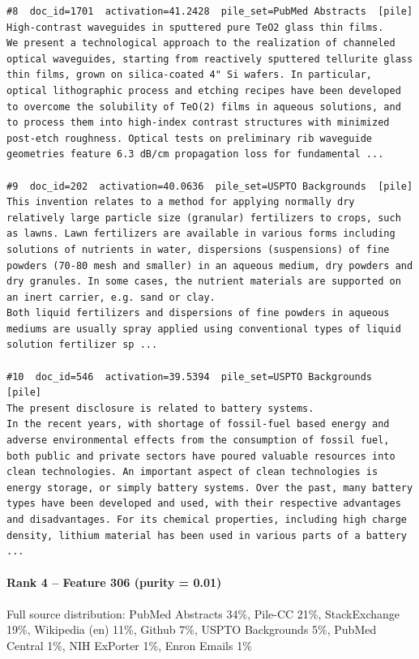 \begin{verbatim}
#8  doc_id=1701  activation=41.2428  pile_set=PubMed Abstracts  [pile]
High-contrast waveguides in sputtered pure TeO2 glass thin films.
We present a technological approach to the realization of channeled optical waveguides, starting from reactively sputtered tellurite glass thin films, grown on silica-coated 4" Si wafers. In particular, optical lithographic process and etching recipes have been developed to overcome the solubility of TeO(2) films in aqueous solutions, and to process them into high-index contrast structures with minimized post-etch roughness. Optical tests on preliminary rib waveguide geometries feature 6.3 dB/cm propagation loss for fundamental ...

#9  doc_id=202  activation=40.0636  pile_set=USPTO Backgrounds  [pile]
This invention relates to a method for applying normally dry relatively large particle size (granular) fertilizers to crops, such as lawns. Lawn fertilizers are available in various forms including solutions of nutrients in water, dispersions (suspensions) of fine powders (70-80 mesh and smaller) in an aqueous medium, dry powders and dry granules. In some cases, the nutrient materials are supported on an inert carrier, e.g. sand or clay.
Both liquid fertilizers and dispersions of fine powders in aqueous mediums are usually spray applied using conventional types of liquid solution fertilizer sp ...

#10  doc_id=546  activation=39.5394  pile_set=USPTO Backgrounds  [pile]
The present disclosure is related to battery systems.
In the recent years, with shortage of fossil-fuel based energy and adverse environmental effects from the consumption of fossil fuel, both public and private sectors have poured valuable resources into clean technologies. An important aspect of clean technologies is energy storage, or simply battery systems. Over the past, many battery types have been developed and used, with their respective advantages and disadvantages. For its chemical properties, including high charge density, lithium material has been used in various parts of a battery ...

\end{verbatim}

\paragraph*{Rank 4 -- Feature 306 (purity = 0.01)}

Full source distribution: PubMed Abstracts 34\%, Pile-CC 21\%, StackExchange 19\%, Wikipedia (en) 11\%, Github 7\%, USPTO Backgrounds 5\%, PubMed Central 1\%, NIH ExPorter 1\%, Enron Emails 1\%

